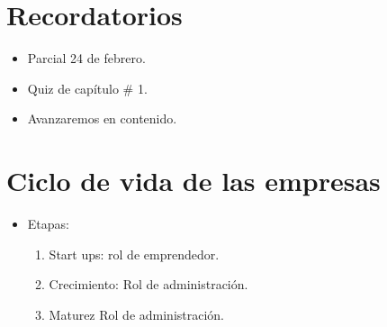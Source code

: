 \section{Recordatorios}
\begin{itemize}
    \item Parcial 24 de febrero.
    \item Quiz de capítulo \# 1.
    \item Avanzaremos en contenido.
\end{itemize}


\section{Ciclo de vida de las empresas}
\begin{itemize}
    \item Etapas:
        \begin{enumerate}
            \item Start ups: rol de emprendedor. 
            \item Crecimiento: Rol de administración.
            \item Maturez Rol de administración.
        \end{enumerate}
    

\end{itemize}
